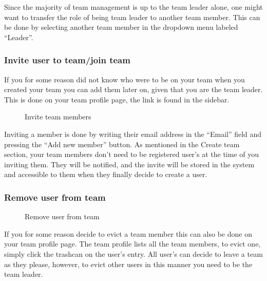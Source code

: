 Since the majority of team management is up to the team leader alone,
one might want to transfer the role of being team leader to another
team member. This can be done by selecting another team member in the
dropdown menu labeled {\textquotedblleft}Leader{\textquotedblright}.


\bigskip


\bigskip

\subsubsection{Invite user to team/join team}

If you for some reason did not know who were to be on your team when you
created your team you can add them later on, given that you are the
team leader. This is done on your team profile page, the link is found
in the sidebar.

\begin{figure}
\centering
 \caption{Invite team members}
 \label{fig:teamInvite}
\end{figure}

Inviting a member is done by writing their email address in the
{\textquotedblleft}Email{\textquotedblright} field and pressing the
{\textquotedblleft}Add new member{\textquotedblright} button. As
mentioned in the Create team section, your team members
don{\textquoteright}t need to be registered user{\textquoteright}s at
the time of you inviting them. They will be notified, and the invite
will be stored in the system and accessible to them when they finally
decide to create a user. 

\subsubsection{Remove user from team}

\begin{figure}
\centering
 \caption{Remove user from team}
 \label{fig:teamRemoveUser}
\end{figure}

If you for some reason decide to evict a team member this can also be
done on your team profile page. The team profile lists all the team
members, to evict one, simply click the trashcan on the
user{\textquoteright}s entry. All user{\textquoteright}s can decide to
leave a team as they please, however, to evict other users in this
manner you need to be the team leader.


